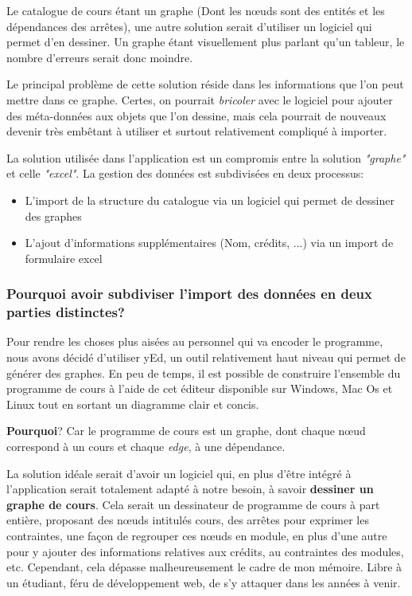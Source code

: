 Le catalogue de cours étant un graphe (Dont les nœuds sont des entités et les dépendances des arrêtes), une autre solution serait d'utiliser un logiciel qui permet d'en dessiner. Un graphe étant visuellement plus parlant  qu'un tableur, le nombre d'erreurs serait donc moindre. 

Le principal problème de cette solution réside dans les informations que l'on peut mettre dans ce graphe. Certes, on pourrait \textit{bricoler} avec le logiciel pour ajouter des méta-données aux objets que l'on dessine, mais cela pourrait de nouveaux devenir très embêtant à utiliser et surtout relativement compliqué à importer. 
  
La solution utilisée dans l'application est un compromis entre la solution \textit{"graphe"} et celle \textit{"excel"}. La gestion des données est subdivisées en deux processus:
\begin{itemize}
\item L'import de la structure du catalogue via un logiciel qui permet de dessiner des graphes
\item L'ajout d'informations supplémentaires (Nom, crédits, ...) via un import de formulaire excel
\end{itemize}
\subsubsection{Pourquoi avoir subdiviser l'import des données en deux parties distinctes?}

Pour rendre les choses plus aisées au personnel qui va encoder le programme, nous avons décidé d'utiliser yEd, un outil relativement haut niveau qui permet de générer des graphes. En peu de temps, il est possible de construire l'ensemble du programme de cours à l'aide de cet éditeur disponible sur Windows, Mac Os et Linux tout en sortant un diagramme clair et concis.


\textbf{Pourquoi}? Car le programme de cours est un graphe, dont chaque nœud correspond à un cours et chaque \textit{edge}, à une dépendance. 

La solution idéale serait d'avoir un logiciel qui, en plus d'être intégré à l'application serait totalement adapté à notre besoin, à savoir \textbf{dessiner un graphe de cours}. Cela serait un dessinateur de programme de cours à part entière, proposant des nœuds intitulés cours, des arrêtes pour exprimer les contraintes, une façon de regrouper ces nœuds en module, en plus d'une autre pour y ajouter des informations relatives aux crédits, au contraintes des modules, etc. Cependant, cela dépasse malheureusement le cadre de mon mémoire. Libre à un étudiant, féru de développement web, de s'y attaquer dans les années à venir.

